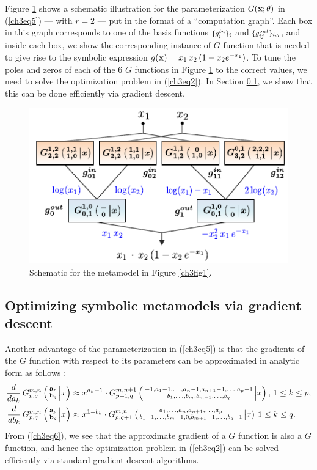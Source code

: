 \documentclass [PhD] {uclathes}
\newcommand{\MeijerG}[7]{G^{#1,#2}_{#3,#4} \left( \begin{smallmatrix} #5 \\ #6 \end{smallmatrix} \middle\vert #7 \right) }
\begin{document}
Figure \ref{ch3fig3} shows a schematic illustration for the parameterization $G({\bf x};\theta)$ in (\ref{ch3eq5}) --- with $r=2$ --- put in the format of a ``computation graph''. Each box in this graph corresponds to one of the basis functions $\mbox{\footnotesize $\{g_i^{in}\}_i$}$ and $\mbox{\footnotesize $\{g_{ij}^{out}\}_{i,j}$}$, and inside each box, we show the corresponding instance of $G$ function that is needed to give rise to the symbolic expression $g({\bf x}) = x_1\,x_2\,(1-x_2e^{-x_1})$. To tune the poles and zeros of each of the 6 $G$ functions in Figure \ref{ch3fig3} to the correct values, we need to solve the optimization problem in (\ref{ch3eq2}). In Section \ref{ch3Sec33}, we show that this can be done efficiently via gradient descent. 

\begin{figure}[t]
\centering
\includegraphics[width=4.5in]{ch3Fig3.pdf}
\caption{Schematic for the metamodel in Figure \ref{ch3fig1}.}
\label{ch3fig3} 
\end{figure}

\subsection{Optimizing symbolic metamodels via gradient descent}
\label{ch3Sec33} 
Another advantage of the parameterization in (\ref{ch3eq5}) is that the gradients of the $G$ function with respect to its parameters can be approximated in analytic form as follows \cite{beals2013meijer}: 
\begin{align}
\frac{d}{da_k}\,\MeijerG{m}{n}{p}{q}{{\bf a}_p}{{\bf b}_q}{x} &\approx x^{a_k - 1} \cdot \MeijerG{m}{n+1}{p+1}{q}{-1, a_1-1,.\,.\,.,a_n-1,a_{n+1}-1,.\,.\,.,a_{p}-1}{b_1,.\,.\,.,b_m,b_{m+1},.\,.\,.,b_{q}}{x},\, 1 \leq k \leq p, \nonumber \\
\frac{d}{db_k}\,\MeijerG{m}{n}{p}{q}{{\bf a}_p}{{\bf b}_q}{x} &\approx x^{1-b_k} \cdot \MeijerG{m}{n}{p}{q+1}{a_1,.\,.\,.,a_n,a_{n+1},.\,.\,.,a_{p}}{b_1-1,.\,.\,.,b_m-1,0,b_{m+1}-1,.\,.\,.,b_{q}-1}{x}\, 1 \leq k \leq q.
\label{ch3eq6}
\end{align}
From (\ref{ch3eq6}), we see that the approximate gradient of a $G$ function is also a $G$ function, and hence the optimization problem in (\ref{ch3eq2}) can be solved efficiently via standard gradient descent algorithms.
\end{document}
